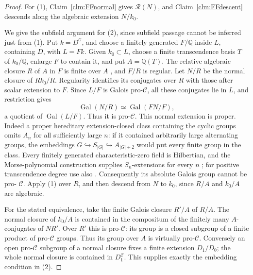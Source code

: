\documentclass[11pt]{article}
\begin{document}
\begin{proof}
For (1), Claim~\ref{clm:FFnormal} gives \(\mathcal R(N)\),
and Claim~\ref{clm:FFdescent} descends along the algebraic
extension \(N/k_0\).

We give the subfield argument for (2), since subfield passage
cannot be inferred just from (1). Put \(k=D^{\mathcal C}\),
and choose a finitely generated \(F/\mathbb Q\) inside
\(L\), containing \(D\), with \(L=Fk\). Given
\(k_0\subset L\), choose a finite transcendence basis \(T\)
of \(k_0/\mathbb Q\), enlarge \(F\) to contain it, and
put \(A=\mathbb Q(T)\). The relative algebraic closure
\(R\) of \(A\) in \(F\) is finite over \(A\)
\citep[Lemma~9.26.11]{FF_StacksFields}, and \(F/R\) is
regular. Let \(N/R\) be the normal closure of \(Rk_0/R\).
Regularity identifies its conjugates over \(R\) with those
after scalar extension to \(F\). Since \(L/F\) is Galois
pro-\(\mathcal C\), all these conjugates lie in \(L\),
and restriction gives
\[
 \operatorname{Gal}(N/R)
   \simeq\operatorname{Gal}(FN/F),
\]
a quotient of \(\operatorname{Gal}(L/F)\). Thus it is
pro-\(\mathcal C\). This normal extension is proper.
Indeed a proper hereditary extension-closed class containing
the cyclic groups omits \(A_n\) for all sufficiently large
\(n\): if it contained arbitrarily large alternating groups,
the embeddings \(G\hookrightarrow S_{|G|}\hookrightarrow
A_{|G|+2}\) would put every finite group in the class.
Every finitely generated characteristic-zero field is
Hilbertian, and the Morse-polynomial construction supplies
\(S_n\)-extensions for every \(n\)
\citep[Theorems~3.4.1, 4.4.5]{FF_Serre2007}; for positive
transcendence degree use also
\citep[Theorem~1.2]{FF_BarySorokerParan2013}.
Consequently its absolute Galois group cannot be pro-
\(\mathcal C\). Apply (1) over \(R\), and then descend
from \(N\) to \(k_0\), since \(R/A\) and \(k_0/A\)
are algebraic.

For the stated equivalence, take the finite Galois closure
\(R'/A\) of \(R/A\). The normal closure of \(k_0/A\)
is contained in the compositum of the finitely many
\(A\)-conjugates of \(NR'\). Over \(R'\) this is
pro-\(\mathcal C\): its group is a closed subgroup of a
finite product of pro-\(\mathcal C\) groups. Thus its
group over \(A\) is virtually pro-\(\mathcal C\).
Conversely an open pro-\(\mathcal C\) subgroup of a normal
closure fixes a finite extension \(D_1/D_0\); the whole
normal closure is contained in \(D_1^{\mathcal C}\).
This supplies exactly the embedding condition in (2).


\end{proof}
\end{document}
